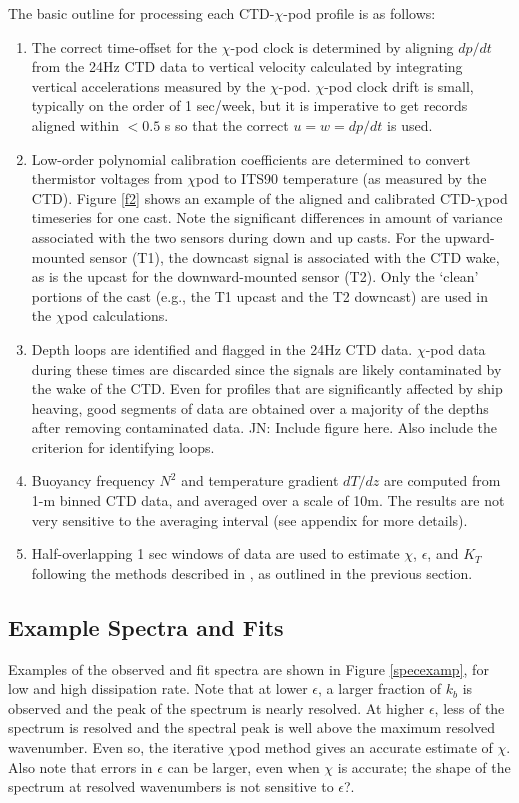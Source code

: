 \documentclass{ametsoc}
\begin{document}
The basic outline for processing each CTD-$\chi$-pod profile is as follows:
\begin{enumerate}
\item The correct time-offset for the $\chi$-pod clock is determined by aligning $dp/dt$ from the 24Hz CTD data to vertical velocity calculated by integrating vertical accelerations measured by the $\chi$-pod. $\chi$-pod clock drift is small, typically on the order of 1 sec/week, but it is imperative to get records aligned within $< 0.5$ s so that the correct $u = w = d p/dt$ is used.
\item Low-order polynomial calibration coefficients are determined to convert thermistor voltages from $\chi$pod to ITS90 temperature (as measured by
the CTD). Figure \ref{f2} shows an example of the aligned and calibrated CTD-$\chi$pod timeseries for one cast. Note the significant differences in amount of variance associated with the two sensors during down and up casts. For the upward-mounted sensor (T1), the downcast signal is associated with the CTD wake, as is the upcast for the downward-mounted sensor (T2). Only the `clean' portions of the cast (e.g., the T1 upcast and the T2 downcast) are used in the $\chi$pod calculations.
\item Depth loops are identified and flagged in the 24Hz CTD data. $\chi$-pod data during these times are discarded since the signals are likely contaminated by the wake of the CTD. Even for profiles that are significantly affected by ship heaving, good segments of data are obtained over a majority of the depths after removing contaminated data. {JN: Include figure here. Also include the criterion for identifying loops.}
\item Buoyancy frequency $N^2$ and temperature gradient $dT/dz$ are computed from 1-m binned CTD data, and averaged over a scale of 10m. The results are not very sensitive to the averaging interval (see appendix for more details).
\item Half-overlapping 1 sec windows of data are used to estimate $\chi$, $\epsilon$, and $K_T$ following the methods described in \cite{moumnash09}, as outlined in the previous section.
\end{enumerate}


\subsection{Example Spectra and Fits}

Examples of the observed and fit spectra are shown in Figure \ref{specexamp}, for low and high dissipation rate. Note that at lower $\epsilon$, a larger fraction of $k_b$ is observed and the peak of the spectrum is nearly resolved. At higher $\epsilon$, less of the spectrum is resolved and the spectral peak is well above the maximum resolved wavenumber. Even so, the iterative $\chi$pod method gives an accurate estimate of $\chi$. Also note that errors in $\epsilon$ can be larger, even when $\chi$ is accurate; the shape of the spectrum at resolved wavenumbers is not sensitive to $\epsilon$?. 
\end{document}
